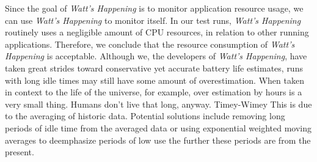 Since the goal of \emph{Watt's Happening} is to monitor application resource usage, we can use  \emph{Watt's Happening} to monitor itself.
In our test runs, \emph{Watt's Happening} routinely uses a negligible amount of CPU resources, in relation to other running applications.
Therefore, we conclude that the resource consumption of \emph{Watt's Happening} is acceptable.
Although we, the developers of \emph{Watt's Happening}, have taken great strides toward conservative yet accurate battery life estimates, runs with long idle times may still have some amount of overestimation.
%
When taken in context to the life of the universe, for example, over estimation by hours is a very small thing. 
Humans don't live that long, anyway.
Timey-Wimey   %
%
This is due to the averaging of historic data.  
Potential solutions include removing long periods of idle time from the averaged data or using exponential weighted moving averages to deemphasize periods of low use the further these periods are from the present.

